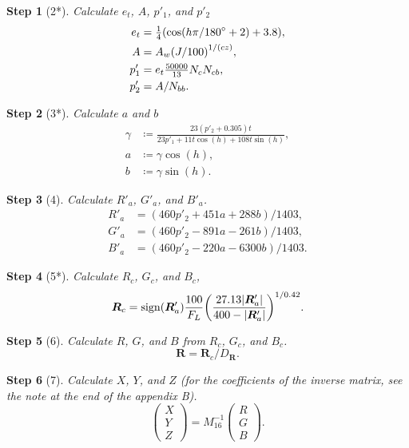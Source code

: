 \documentclass[twocolumn]{scrartcl}
\theoremstyle{named}
\newtheorem*{step}{Step}
\DeclarePairedDelimiter\abs{\lvert}{\rvert}%
\DeclareMathOperator{\sign}{sign}
\newcommand\rgb{\bm{R}}
\begin{document}
\begin{step}[2*]
Calculate $e_t$, $A$, $p'_1$, and $p'_2$
\begin{align*}
  e_t &= \tfrac{1}{4} (\cos(h\pi/180\degree + 2) + 3.8),\\
  A &= A_w  {(J/100)}^{1/(cz)},\\
  p'_1 &= e_t \tfrac{50000}{13} N_c N_{cb},\\
  p'_2 &= A / N_{bb}.
\end{align*}
\end{step}

\begin{step}[3*]
Calculate $a$ and $b$
  \begin{align*}
    \gamma &\coloneqq \frac{23 (p'_2+0.305) t}{23 p'_1 + 11 t \cos(h) + 108 t \sin(h)},\\
    a &\coloneqq \gamma \cos(h),\\
    b &\coloneqq \gamma \sin(h).
  \end{align*}
\end{step}

\begin{step}[4]
  Calculate $R'_a$, $G'_a$, and $B'_a$.
  \begin{align*}
    R'_a &= (460 p'_2 + 451 a + 288 b) / 1403,\\
    G'_a &= (460 p'_2 - 891 a - 261 b) / 1403,\\
    B'_a &= (460 p'_2 - 220 a - 6300 b) / 1403.
  \end{align*}%
\end{step}

\begin{step}[5*]
Calculate $R_c$, $G_c$, and $B_c$,
  \[
  \rgb_c = \sign(\rgb'_a)
  \frac{100}{F_L} {\left(
    \frac{27.13 \abs{\rgb'_a}}{400 - \abs{\rgb'_a}}
    \right)}^{1/0.42}.
  \]
\end{step}

\begin{step}[6]
Calculate $R$, $G$, and $B$ from $R_c$, $G_c$, and $B_c$.
\[
  \rgb = \rgb_c / D_{\rgb}.
\]
\end{step}

\begin{step}[7]
Calculate $X$, $Y$, and $Z$ (for the coefficients of the inverse matrix, see
the note at the end of the appendix B).  %
\[
\begin{pmatrix}X\\Y\\Z\end{pmatrix}
  = M_{16}^{-1}
\begin{pmatrix}R\\G\\B\end{pmatrix}.
\]
\end{step}
\end{document}
